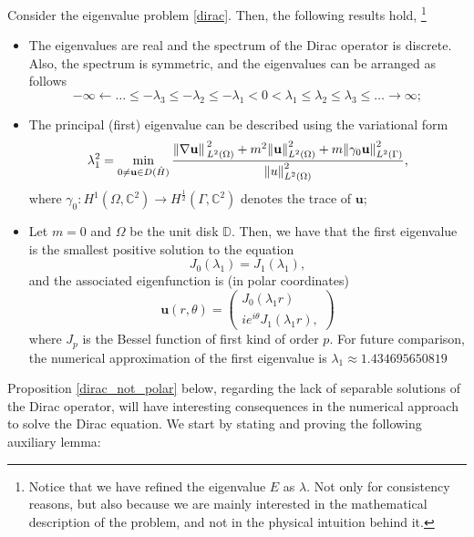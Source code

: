 \begin{proposition}\label{dirac_properties}
    Consider the eigenvalue problem \eqref{dirac}. Then, the following results hold, \footnote{Notice that we have refined the eigenvalue \(E\) as \(\lambda\). Not only for consistency reasons, but also because we are mainly interested in the mathematical description of the problem, and not in the physical intuition behind it.}
    \begin{itemize}
        \item The eigenvalues are real and the spectrum of the Dirac operator is discrete. Also, the spectrum is symmetric, and the eigenvalues can be arranged as follows
        \[
        -\infty \leftarrow \dots \leq -\lambda_3 \leq -\lambda_2 \leq -\lambda_1 < 0 < \lambda_1 \leq \lambda_2 \leq \lambda_3 \leq \dots \rightarrow \infty;
        \]
        \item The principal (first) eigenvalue can be described using the variational form
        \[
        \lambda_1^2 = \min_{0 \neq \mathbf{u} \in D(\hat{H})}\frac{\norm*{\nabla \mathbf{u}}_{L^2(\Omega)}^2 + m^2 \norm{\mathbf{u}}_{L^2(\Omega)}^2 + m \norm{\gamma_0 \mathbf{u}}_{L^2(\Gamma)}^2}{\norm{u}_{L^2(\Omega)}^2},
        \]
        where \(\gamma_0: H^1(\Omega, \mathbb{C}^2) \rightarrow H^{\frac{1}{2}}(\Gamma, \mathbb{C}^2)\) denotes the trace of \(\mathbf{u}\);
        \item Let \(m=0\) and \(\Omega\) be the unit disk \(\mathbb{D}\). Then, we have that the first eigenvalue is the smallest positive solution to the equation
        \[
        J_0(\lambda_1) = J_1(\lambda_1),
        \]
        and the associated eigenfunction is (in polar coordinates)
        \[
            \mathbf{u}(r, \theta) = \begin{pmatrix}
            J_0(\lambda_1 r)\\
            i e^{i \theta}J_1(\lambda_1 r),
        \end{pmatrix}
        \]
        where \(J_p\) is the Bessel function of first kind of order \(p\).
        For future comparison, the numerical approximation of the first eigenvalue is \(\lambda_1 \approx 1.434695650819\)
    \end{itemize}
\end{proposition}

Proposition \ref{dirac_not_polar} below, regarding the lack of separable solutions of the Dirac operator, will have interesting consequences in the numerical approach to solve the Dirac equation. We start by stating and proving the following auxiliary lemma:

